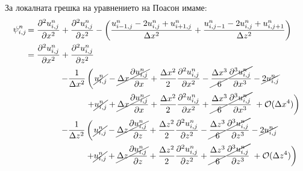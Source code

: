 \documentclass[12pt]{article}
\numberwithin{equation}{section}
\begin{document}
За локалната грешка на уравнението на Поасон имаме:
\begin{equation}
    \begin{aligned}
        \psi^n_{i,j} \, &
        \begin{aligned}
            = \frac{\partial^2 u^n_{i,j}}{\partial x^2} + \frac{\partial^2 u^n_{i,j}}{\partial z^2}
            - \left( \frac{u^n_{i-1,j} - 2u^n_{i,j} + u^n_{i+1,j}}{\Delta x^2} + \frac{u^n_{i,j-1} - 2u^n_{i,j} + u^n_{i,j+1}}{\Delta z^2} \right)
        \end{aligned}
        \\
        &
        \begin{aligned}
            = \frac{\partial^2 u^n_{i,j}}{\partial x^2} + \frac{\partial^2 u^n_{i,j}}{\partial z^2}
        \end{aligned}
        \\
        &
        \hspace{4em}
        \begin{aligned}
            - \frac{1}{\Delta x^2} \left( \vphantom{\frac{\partial u^n_{i,j}}{\partial x}} \right. &\cancel{u^n_{i,j}} - \cancel{\Delta x \frac{\partial u^n_{i,j}}{\partial x}} + \frac{\Delta x^2}{2} \frac{\partial^2 u^n_{i,j}}{\partial x^2} - \cancel{\frac{\Delta x^3}{6}\frac{\partial^3 u^n_{i,j}}{\partial x^3}} -\cancel{2u^n_{i,j}} \\
            + &\cancel{u^n_{i,j}} + \cancel{\Delta x \frac{\partial u^n_{i,j}}{\partial x}} + \frac{\Delta x^2}{2} \frac{\partial^2 u^n_{i,j}}{\partial x^2} + \cancel{\frac{\Delta x^3}{6}\frac{\partial^3 u^n_{i,j}}{\partial x^3}} \left. \vphantom{\frac{\partial u^n_{i,j}}{\partial x}} + \mathcal{O}(\Delta x^4) \right)
        \end{aligned}
        \\
        &
        \hspace{4em}
        \begin{aligned}
            - \frac{1}{\Delta z^2} \left( \vphantom{\frac{\partial u^n_{i,j}}{\partial x}} \right. &\cancel{u^n_{i,j}} - \cancel{\Delta z \frac{\partial u^n_{i,j}}{\partial z}} + \frac{\Delta z^2}{2} \frac{\partial^2 u^n_{i,j}}{\partial z^2} - \cancel{\frac{\Delta z^3}{6}\frac{\partial^3 u^n_{i,j}}{\partial z^3}} -\cancel{2u^n_{i,j}} \\
            + &\cancel{u^n_{i,j}} + \cancel{\Delta z \frac{\partial u^n_{i,j}}{\partial z}} + \frac{\Delta z^2}{2} \frac{\partial^2 u^n_{i,j}}{\partial z^2} + \cancel{\frac{\Delta z^3}{6}\frac{\partial^3 u^n_{i,j}}{\partial z^3}} \left. \vphantom{\frac{\partial u^n_{i,j}}{\partial x}} + \mathcal{O}(\Delta z^4) \right)

\end{aligned}
\end{aligned}
\end{equation}
\end{document}
